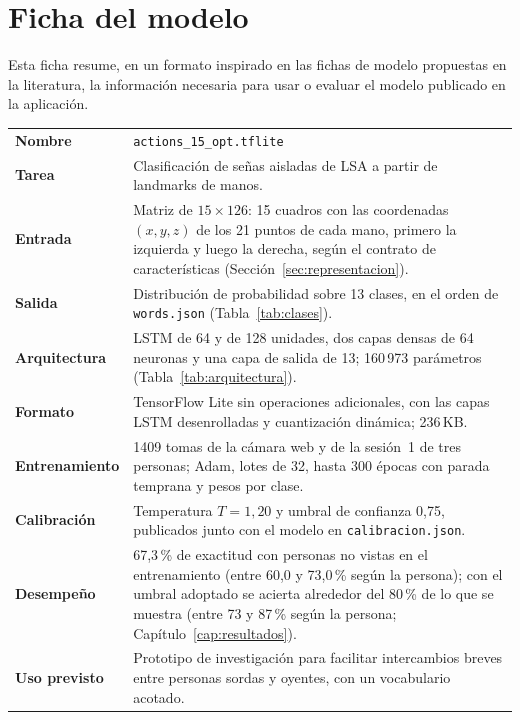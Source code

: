 \chapter{Ficha del modelo}
\label{ap:ficha-modelo}

Esta ficha resume, en un formato inspirado en las fichas de modelo propuestas en la literatura, la información necesaria para usar o evaluar el modelo publicado en la aplicación.

\begin{table}[h]
    \centering
    \small
    \begin{tabular}{p{4cm}p{10cm}}
        \toprule
        \textbf{Nombre} & \texttt{actions\_15\_opt.tflite} \\
        \textbf{Tarea} & Clasificación de señas aisladas de LSA a partir de landmarks de manos. \\
        \textbf{Entrada} & Matriz de $15 \times 126$: 15 cuadros con las coordenadas $(x, y, z)$ de los 21 puntos de cada mano, primero la izquierda y luego la derecha, según el contrato de características (Sección~\ref{sec:representacion}). \\
        \textbf{Salida} & Distribución de probabilidad sobre 13 clases, en el orden de \texttt{words.json} (Tabla~\ref{tab:clases}). \\
        \textbf{Arquitectura} & LSTM de 64 y de 128 unidades, dos capas densas de 64 neuronas y una capa de salida de 13; 160\,973 parámetros (Tabla~\ref{tab:arquitectura}). \\
        \textbf{Formato} & TensorFlow Lite sin operaciones adicionales, con las capas LSTM desenrolladas y cuantización dinámica; 236\,KB. \\
        \textbf{Entrenamiento} & 1409 tomas de la cámara web y de la sesión~1 de tres personas; Adam, lotes de 32, hasta 300 épocas con parada temprana y pesos por clase. \\
        \textbf{Calibración} & Temperatura $T = 1{,}20$ y umbral de confianza 0,75, publicados junto con el modelo en \texttt{calibracion.json}. \\
        \textbf{Desempeño} & 67,3\,\% de exactitud con personas no vistas en el entrenamiento (entre 60,0 y 73,0\,\% según la persona); con el umbral adoptado se acierta alrededor del 80\,\% de lo que se muestra (entre 73 y 87\,\% según la persona; Capítulo~\ref{cap:resultados}). \\
        \textbf{Uso previsto} & Prototipo de investigación para facilitar intercambios breves entre personas sordas y oyentes, con un vocabulario acotado. \\

\end{tabular}
\end{table}
